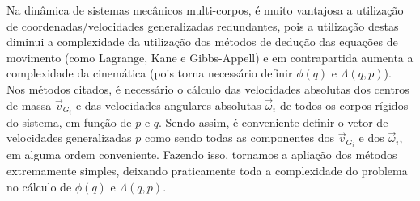 \documentclass[12pt,a4paper]{article}
\begin{document}
Na dinâmica de sistemas mecânicos multi-corpos, é muito vantajosa a utilização de coordenadas/velocidades generalizadas redundantes, pois a utilização destas diminui a complexidade da utilização dos métodos de dedução das equações de movimento (como Lagrange, Kane e Gibbs-Appell) e em contrapartida aumenta a complexidade da cinemática (pois torna necessário definir $\phi(q)$ e $\Lambda(q,p)$). \\

Nos métodos citados, é necessário o cálculo das velocidades absolutas dos centros de massa $\vec{v}_{G_i}$ e das velocidades angulares absolutas $\vec{\omega}_i$ de todos os corpos rígidos do sistema, em função de $p$ e $q$. Sendo assim, é conveniente definir o vetor de velocidades generalizadas $p$ como sendo todas as componentes dos $\vec{v}_{G_i}$ e dos $\vec{\omega}_i$, em alguma ordem conveniente. Fazendo isso, tornamos a apliação dos métodos extremamente simples, deixando praticamente toda a complexidade do problema no cálculo de $\phi(q)$ e $\Lambda(q,p)$. \\
\end{document}

